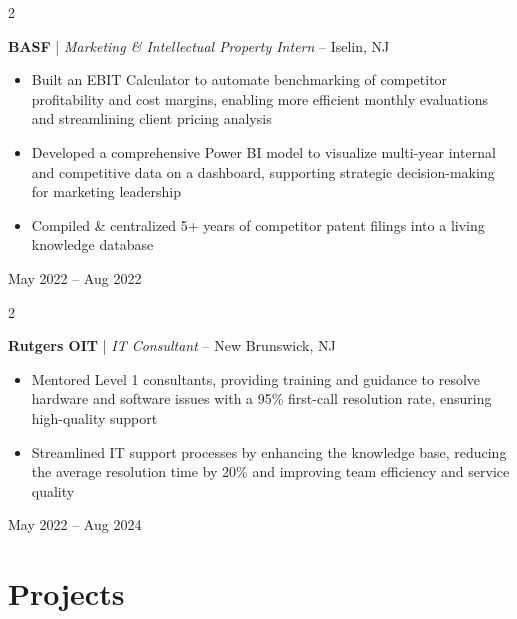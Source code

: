\documentclass[10pt, letterpaper]{article}
\newenvironment{highlights}{
    \begin{itemize}[
        topsep=0.10 cm,
        parsep=0.10 cm,
        partopsep=0pt,
        itemsep=0pt,
        leftmargin=0.4 cm + 10pt
    ]
}{
    \end{itemize}
}
\newenvironment{twocolentry}[2][]{
    \onecolentry
    \def\secondColumn{#2}
    \setcolumnwidth{\fill, 4.5 cm}
    \begin{paracol}{2}
}{
    \switchcolumn \raggedleft \secondColumn
    \end{paracol}
    \endonecolentry
}
\begin{document}
        \vspace{0.2 cm}

        \begin{twocolentry}{
        May 2022 – Aug 2022
        }
            \textbf{BASF} | \textit{Marketing \& Intellectual Property Intern} – Iselin, NJ
            \begin{highlights}
                \item Built an EBIT Calculator to automate benchmarking of competitor profitability and cost margins, enabling more efficient monthly evaluations and streamlining client pricing analysis
                \item Developed a comprehensive Power BI model to visualize multi-year internal and competitive data on a dashboard, supporting strategic decision-making for marketing leadership
                \item Compiled \& centralized 5+ years of competitor patent filings into a living knowledge database
            \end{highlights}
        \end{twocolentry}

        \vspace{0.2 cm}

        \begin{twocolentry}{
        May 2022 – Aug 2024
        }
            \textbf{Rutgers OIT} | \textit{IT Consultant} – New Brunswick, NJ
            \begin{highlights}
                \item Mentored Level 1 consultants, providing training and guidance to resolve hardware and software issues with a 95\% first-call resolution rate, ensuring high-quality support
                \item Streamlined IT support processes by enhancing the knowledge base, reducing the average resolution time by 20\% and improving team efficiency and service quality
            \end{highlights}
        \end{twocolentry}
        
    \section{Projects}
\end{document}
